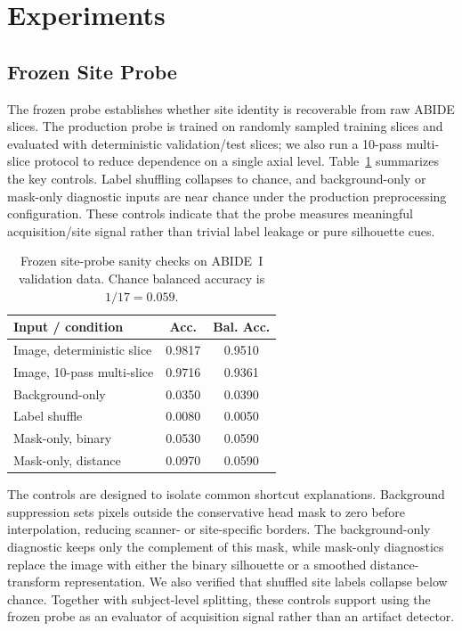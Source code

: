 \documentclass{article}
\begin{document}
\section{Experiments}
\subsection{Frozen Site Probe}
The frozen probe establishes whether site identity is recoverable from raw ABIDE slices. The production probe is trained on randomly sampled training slices and evaluated with deterministic validation/test slices; we also run a 10-pass multi-slice protocol to reduce dependence on a single axial level. Table~\ref{tab:probe_sanity} summarizes the key controls. Label shuffling collapses to chance, and background-only or mask-only diagnostic inputs are near chance under the production preprocessing configuration. These controls indicate that the probe measures meaningful acquisition/site signal rather than trivial label leakage or pure silhouette cues.

\begin{table}[tb]
\centering
\caption{Frozen site-probe sanity checks on ABIDE~I validation data. Chance balanced accuracy is $1/17=0.059$.}
\label{tab:probe_sanity}
\scriptsize
\begin{tabular}{lcc}
\toprule
Input / condition & Acc. & Bal. Acc. \\
\midrule
Image, deterministic slice & 0.9817 & 0.9510 \\
Image, 10-pass multi-slice & 0.9716 & 0.9361 \\
Background-only & 0.0350 & 0.0390 \\
Label shuffle & 0.0080 & 0.0050 \\
Mask-only, binary & 0.0530 & 0.0590 \\
Mask-only, distance & 0.0970 & 0.0590 \\
\bottomrule
\end{tabular}
\end{table}

The controls are designed to isolate common shortcut explanations. Background suppression sets pixels outside the conservative head mask to zero before interpolation, reducing scanner- or site-specific borders. The background-only diagnostic keeps only the complement of this mask, while mask-only diagnostics replace the image with either the binary silhouette or a smoothed distance-transform representation. We also verified that shuffled site labels collapse below chance. Together with subject-level splitting, these controls support using the frozen probe as an evaluator of acquisition signal rather than an artifact detector.
\end{document}
